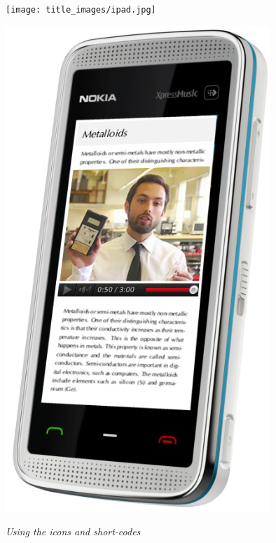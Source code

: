 \begin{center}
\begin{minipage}{0.6\textwidth}
\centering
\texttt{[image: title\_images/ipad.jpg]}
\end{minipage}
\begin{minipage}{0.3\textwidth}
\centering
\includegraphics[width=0.75\textwidth]{title_images/phone.png}
\end{minipage}
\end{center}


\vspace*{2cm}


{\normalfont\sffamily\fontsize{22}\normalfont\itshape Using the icons and short-codes} \par

